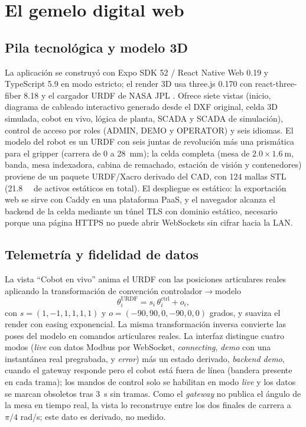 \documentclass{styles/svproc}
\begin{document}
\section{El gemelo digital web}

\subsection{Pila tecnológica y modelo 3D}
La aplicación se construyó con Expo SDK 52 / React Native Web 0.19 y
TypeScript 5.9 en modo estricto; el render 3D usa three.js 0.170
\cite{threejs} con react-three-fiber 8.18 y el cargador URDF de NASA JPL
\cite{urdfloaders}. Ofrece siete vistas (inicio, diagrama de cableado
interactivo generado desde el DXF original, celda 3D simulada, cobot en
vivo, lógica de planta, SCADA y SCADA de simulación), control de acceso por
roles (ADMIN, DEMO y OPERATOR) y seis idiomas. El modelo del robot es un
URDF con seis juntas de revolución más una prismática para el gripper
(carrera de 0 a \SI{28}{\milli\metre}); la celda completa (mesa de
$2.0\times\SI{1.6}{\metre}$, banda, mesa indexadora, cabina de remachado,
estación de visión y contenedores) proviene de un paquete
URDF/Xacro derivado del CAD, con 124 mallas STL (\SI{21.8}{\mega\byte} de
activos estáticos en total). El
despliegue es estático: la exportación web se sirve con Caddy en una
plataforma PaaS, y el navegador alcanza el backend de la celda mediante un
túnel TLS con dominio estático, necesario porque una página HTTPS no puede
abrir WebSockets sin cifrar hacia la LAN.

\subsection{Telemetría y fidelidad de datos}
La vista ``Cobot en vivo'' anima el URDF con las posiciones articulares
reales aplicando la transformación de convención controlador$\to$modelo
\begin{equation}
  \theta_i^{\mathrm{URDF}} = s_i\,\theta_i^{\mathrm{ctrl}} + o_i,
  \label{eq:transform}
\end{equation}
con $s = (1,-1,1,1,1,1)$ y $o = (-90, 90, 0, -90, 0, 0)$ grados, y suaviza
el render con easing exponencial. La misma transformación inversa convierte
las poses del modelo en comandos articulares reales. La interfaz distingue
cuatro modos (\emph{live} con datos Modbus por WebSocket,
\emph{connecting}, \emph{demo} con una instantánea real pregrabada, y
\emph{error}) más un estado derivado, \emph{backend demo}, cuando el
gateway responde pero el cobot está fuera de línea (bandera presente en
cada trama); los mandos de control solo se habilitan en modo \emph{live} y
los datos se marcan obsoletos tras \SI{3}{\second} sin tramas.
Como el \emph{gateway} no publica el ángulo de la mesa en tiempo real, la
vista lo reconstruye entre los dos finales de carrera a $\pi/4$ rad/s; este
dato es derivado, no medido.
\end{document}
